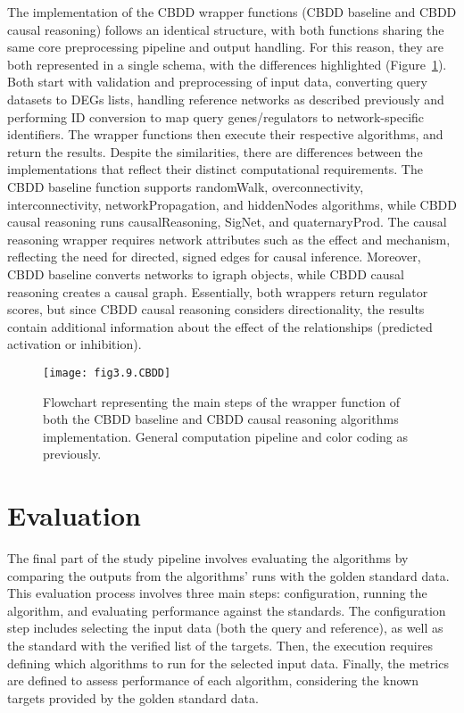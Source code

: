 The implementation of the \gls{CBDD} wrapper functions (\gls{CBDD} baseline and \gls{CBDD} causal reasoning) follows an identical structure, with both functions sharing the same core preprocessing pipeline and output handling.
For this reason, they are both represented in a single schema, with the differences highlighted (Figure~\ref{fig:fig3.9.CBDD}).
Both start with validation and preprocessing of input data, converting query datasets to \gls{DEGs} lists, handling reference networks as described previously and performing ID conversion to map query genes/regulators to network-specific identifiers.
The wrapper functions then execute their respective algorithms, and return the results.
Despite the similarities, there are differences between the implementations that reflect their distinct computational requirements.
The \gls{CBDD} baseline function supports randomWalk, overconnectivity, interconnectivity, networkPropagation, and hiddenNodes algorithms, while \gls{CBDD} causal reasoning runs causalReasoning, SigNet, and quaternaryProd.
The causal reasoning wrapper requires network attributes such as the effect and mechanism, reflecting the need for directed, signed edges for causal inference.
Moreover, \gls{CBDD} baseline converts networks to igraph objects, while \gls{CBDD} causal reasoning creates a causal graph.
Essentially, both wrappers return regulator scores, but since \gls{CBDD} causal reasoning considers directionality, the results contain additional information about the effect of the relationships (predicted activation or inhibition).

\begin{figure}[htbp]
    \centering
    \texttt{[image: fig3.9.CBDD]}
    \caption[Flowchart representing the main steps of the wrapper function of both the CBDD baseline and CBDD causal reasoning algorithms implementation.]{Flowchart representing the main steps of the wrapper function of both the \gls{CBDD} baseline and \gls{CBDD} causal reasoning algorithms implementation. General computation pipeline and color coding as previously.}
    \label{fig:fig3.9.CBDD}
\end{figure}


\section{Evaluation} %
\label{sec:evaluation}

The final part of the study pipeline involves evaluating the algorithms by comparing the outputs from the algorithms' runs with the golden standard data.
This evaluation process involves three main steps: configuration, running the algorithm, and evaluating performance against the standards.
The configuration step includes selecting the input data (both the query and reference), as well as the standard with the verified list of the targets.
Then, the execution requires defining which algorithms to run for the selected input data.
Finally, the metrics are defined to assess performance of each algorithm, considering the known targets provided by the golden standard data. 

